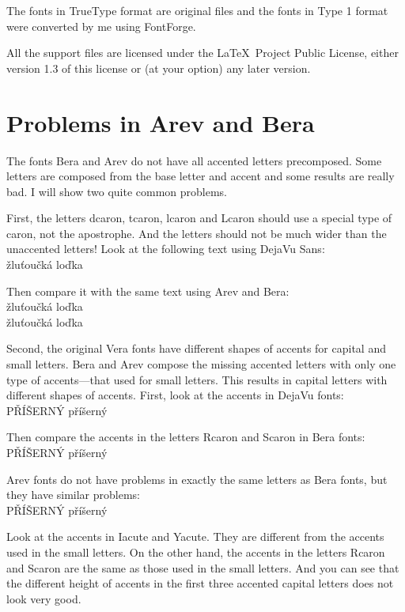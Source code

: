 \documentclass[oneside]{scrartcl}
\begin{document}
The fonts in TrueType format are original files and the
fonts in Type 1 format were converted by me
using FontForge.

All the support files are licensed under the \LaTeX\ Project Public License,
either version 1.3 of this license or (at  your option) any later version.


\section{Problems in Arev and Bera}

The fonts Bera and Arev do not have all accented letters precomposed.
Some letters are composed from the base letter and accent and some
results are really bad. I will show two quite common problems.

First, the letters dcaron, tcaron, lcaron and Lcaron should use a special type
of caron, not the apostrophe. And the letters should not be much wider
than the unaccented letters! Look at the following text using DejaVu Sans:\\
{\Huge{}žluťoučká loďka}

Then compare it with the same text using Arev and Bera:\\
{\Huge
{žluťoučká loďka}\\	%
{žluťoučká loďka}	%
}

Second, the original Vera fonts have different shapes of accents for capital and
small letters. Bera and Arev compose the missing accented letters with only
one type of accents---that used for small letters. This results in capital
letters with different shapes of accents. First, look at the accents in DejaVu
fonts:\\
{\Huge{}PŘÍŠERNÝ příšerný}

Then compare the accents in the letters Rcaron and Scaron in Bera fonts:\\
{\Huge{}PŘÍŠERNÝ příšerný}		%

Arev fonts do not have problems in exactly the same letters as Bera fonts,
but they have similar problems:\\
{\Huge{}PŘÍŠERNÝ příšerný}		%

Look at the accents in Iacute and Yacute.
They are different from the accents used in the small letters. On the other
hand, the accents in the letters Rcaron and Scaron are the same as those
used in the small letters. And you can see that the different height of
accents in the first three accented capital letters does not look very good.
\end{document}
